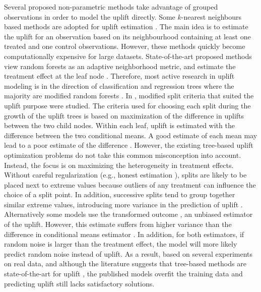 \documentclass{article}
\begin{document}
Several proposed non-parametric methods take advantage of grouped observations in order to model the uplift directly. Some $k$-nearest neighbours \citep{cover1967nearest} based methods are adopted for uplift estimation \citep{crump2008nonparametric, Alemi.etal-PersonalizedMedicine-2009, su2012facilitating}. The main idea is to estimate the uplift for an observation based on its neighbourhood containing at least one treated and one control observations. However, these methods quickly become computationally expensive for large datasets.
State-of-the-art proposed methods view random forests as an adaptive neighborhood metric, and estimate the treatment effect at the leaf node \citep{su2009subgroup,chipman2010bart,wager2018estimation}. Therefore, most active research in uplift modeling is in the direction of classification and regression trees \citep{breiman1984classification} where the majority are modified random forests \citep{Breiman-RandomForest-2001}. %
In \cite{radcliffe1999differential, radcliffe2011real,hansotia2002direct, rzepakowski2010decision}, modified split criteria that suited the uplift purpose were studied. The criteria used for choosing each split during the growth of the uplift trees is based on maximization of the difference in uplifts between the two child nodes. Within each leaf, uplift is estimated with the difference between the two conditional means. A good estimate of each mean may lead to a poor estimate of the difference \citep{radcliffe2011real}. However, the existing tree-based uplift optimization problems do not take this common misconception into account. Instead, the focus is on maximizing the heterogeneity in treatment effects. Without careful regularization (e.g., honest estimation \citep{athey2019generalized}), splits are likely to be placed next to extreme values because outliers of any treatment can influence the choice of a split point. In addition, successive splits tend to group together similar extreme values, introducing more variance in the prediction of uplift \citep{zhao2017practically}. Alternatively some models use the transformed outcome \citep{athey2015machine}, an unbiased estimator of the uplift. However, this estimate suffers from higher variance than the difference in conditional means estimator \citep{powers2018some}. In addition, for both estimators, if random noise is larger than the treatment effect, the model will more likely predict random noise instead of uplift. As a result, based on several experiments on real data, and although the literature suggests that tree-based methods are state-of-the-art for uplift \citep{soltys2015ensemble}, the published models overfit the training data and predicting uplift still lacks satisfactory solutions. %
\end{document}
